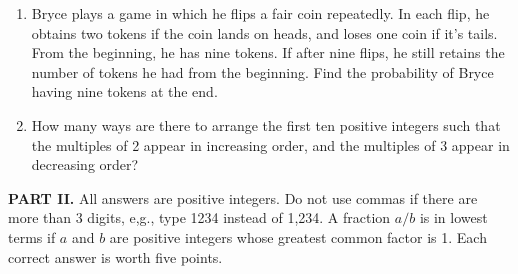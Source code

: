 \documentclass[11pt,paper=letter]{scrartcl}
\begin{document}
\begin{enumerate}[label=\textbf{\arabic*}.]
\begin{center}
\end{center}


\item Bryce plays a game in which he flips a fair coin repeatedly. In each flip, he obtains two tokens if the coin lands on heads, and loses one coin if it's tails. From the beginning, he has nine tokens. If after nine flips, he still retains the number of tokens he had from the beginning. Find the probability of Bryce having nine tokens at the end. 



\newpage

\item How many ways are there to arrange the first ten positive integers such that the multiples of 2 appear in increasing order, and the multiples of 3 appear in decreasing order?


\end{enumerate}

\textbf{PART II.} All answers are positive integers. Do not use commas if there are more than 3 digits, e,g., type 1234 instead of 1,234. A fraction $a/b$ is in lowest terms if $a$ and $b$ are positive integers whose greatest common factor is 1. Each correct answer is worth five points. 
\end{document}
